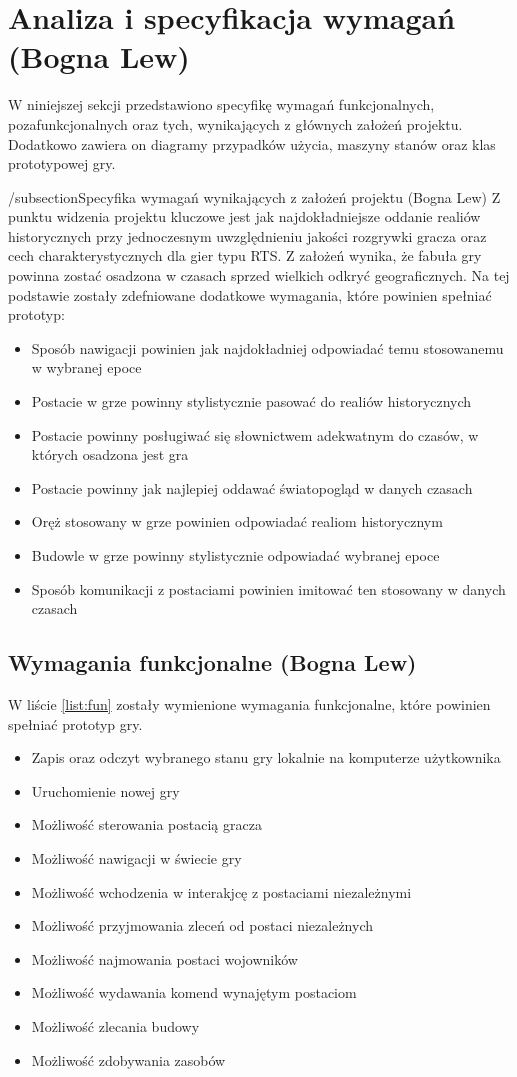 \section{Analiza i specyfikacja wymagań (Bogna Lew)}
W niniejszej sekcji przedstawiono specyfikę wymagań funkcjonalnych, pozafunkcjonalnych oraz tych, wynikających z
głównych założeń projektu. Dodatkowo zawiera on diagramy przypadków użycia, maszyny stanów oraz klas prototypowej gry.

/subsection{Specyfika wymagań wynikających z założeń projektu (Bogna Lew)}
Z punktu widzenia projektu kluczowe jest jak najdokładniejsze oddanie realiów historycznych przy jednoczesnym
uwzględnieniu jakości rozgrywki gracza oraz cech charakterystycznych dla gier typu RTS. Z założeń wynika, że fabuła
gry powinna zostać osadzona w czasach sprzed wielkich odkryć geograficznych. Na tej podstawie zostały zdefniowane
dodatkowe wymagania, które powinien spełniać prototyp:
\begin{itemize}
  \item Sposób nawigacji powinien jak najdokładniej odpowiadać temu stosowanemu w wybranej epoce
  \item Postacie w grze powinny stylistycznie pasować do realiów historycznych
  \item Postacie powinny posługiwać się słownictwem adekwatnym do czasów, w których osadzona jest gra
  \item Postacie powinny jak najlepiej oddawać światopogląd w danych czasach
  \item Oręż stosowany w grze powinien odpowiadać realiom historycznym
  \item Budowle w grze powinny stylistycznie odpowiadać wybranej epoce
  \item Sposób komunikacji z postaciami powinien imitować ten stosowany w danych czasach
\end{itemize}

\subsection{Wymagania funkcjonalne (Bogna Lew)}\label{ss:fun}
W liście \ref{list:fun} zostały wymienione wymagania funkcjonalne, które powinien spełniać prototyp gry.
\begin{itemize}\label{list:fun}
  \item Zapis oraz odczyt wybranego stanu gry lokalnie na komputerze użytkownika
  \item Uruchomienie nowej gry
  \item Możliwość sterowania postacią gracza
  \item Możliwość nawigacji w świecie gry
  \item Możliwość wchodzenia w interakjcę z postaciami niezależnymi
  \item Możliwość przyjmowania zleceń od postaci niezależnych
  \item Możliwość najmowania postaci wojowników
  \item Możliwość wydawania komend wynajętym postaciom
  \item Możliwość zlecania budowy
  \item Możliwość zdobywania zasobów
\end{itemize}

